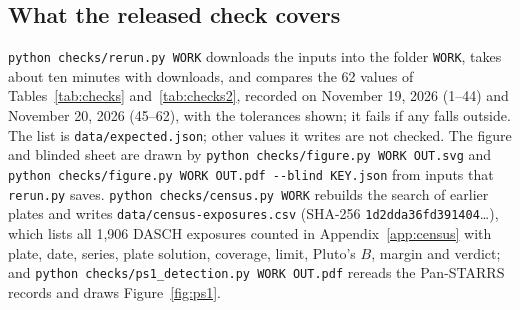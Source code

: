 \documentclass[11pt]{article}
\begin{document}
\begin{appendices}
\section{What the released check covers}
\label{app:checks}

\texttt{python checks/rerun.py WORK} downloads the inputs into the folder \texttt{WORK}, takes about ten minutes with downloads, and compares the 62 values of Tables~\ref{tab:checks} and~\ref{tab:checks2}, recorded on November 19, 2026 (1--44) and November 20, 2026 (45--62), with the tolerances shown; it fails if any falls outside. The list is \texttt{data/expected.json}; other values it writes are not checked. The figure and blinded sheet are drawn by \texttt{python checks/figure.py WORK OUT.svg} and \texttt{python checks/figure.py WORK OUT.pdf -{}-blind KEY.json} from inputs that \texttt{rerun.py} saves. \texttt{python checks/census.py WORK} rebuilds the search of earlier plates and writes \texttt{data/census-exposures.csv} (SHA-256 \texttt{1d2dda36fd391404}\ldots), which lists all 1,906 DASCH exposures counted in Appendix~\ref{app:census} with plate, date, series, plate solution, coverage, limit, Pluto's $B$, margin and verdict; and \texttt{python checks/ps1\_detection.py WORK OUT.pdf} rereads the Pan-STARRS records and draws Figure~\ref{fig:ps1}.


\end{appendices}
\end{document}
